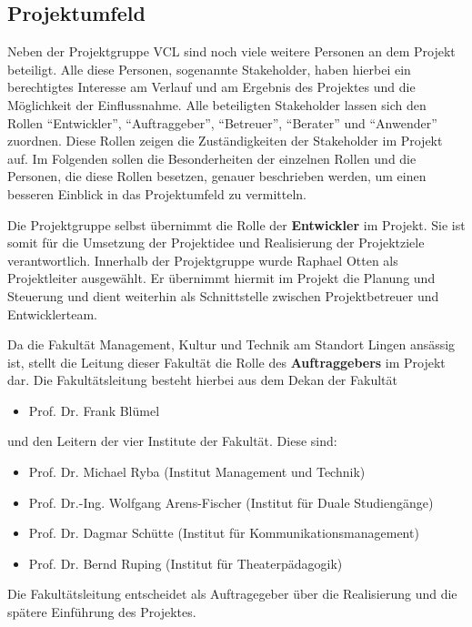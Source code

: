 \subsection{Projektumfeld}
\label{sec:Projektumfeld}

Neben der Projektgruppe \acs{VCL} sind noch viele weitere Personen an dem
Projekt beteiligt. Alle diese Personen, sogenannte Stakeholder, haben hierbei
ein berechtigtes Interesse am Verlauf und am Ergebnis des Projektes und die Möglichkeit
der Einflussnahme. Alle
beteiligten Stakeholder lassen sich den Rollen "`Entwickler"', "`Auftraggeber"',
"`Betreuer"', "`Berater"' und "`Anwender"' zuordnen. Diese Rollen zeigen die Zuständigkeiten
der Stakeholder im Projekt auf.
Im Folgenden sollen die
Besonderheiten der einzelnen Rollen und die Personen, die diese Rollen besetzen,
genauer beschrieben werden, um einen besseren Einblick in das Projektumfeld zu
vermitteln.

Die Projektgruppe selbst übernimmt die Rolle der \textbf{Entwickler} im Projekt. Sie ist
somit für die Umsetzung der Projektidee und Realisierung der Projektziele
verantwortlich. Innerhalb der Projektgruppe wurde Raphael Otten als
Projektleiter ausgewählt. Er übernimmt hiermit im Projekt die Planung und
Steuerung und dient weiterhin als Schnittstelle zwischen Projektbetreuer und
Entwicklerteam.

Da die Fakultät Management, Kultur und Technik am Standort Lingen ansässig ist,
stellt die Leitung dieser Fakultät die Rolle des \textbf{Auftraggebers} im Projekt dar.
Die Fakultätsleitung besteht hierbei aus dem Dekan der Fakultät
\begin{itemize}
  \item Prof. Dr. Frank Blümel
\end{itemize}
und den Leitern der vier Institute der Fakultät. Diese sind:

\clearpage

\begin{itemize}
  \item Prof. Dr. Michael Ryba (Institut Management und Technik)
  \item Prof. Dr.-Ing. Wolfgang Arens-Fischer (Institut für Duale Studiengänge)
  \item Prof. Dr. Dagmar Schütte (Institut für Kommunikationsmanagement)
  \item Prof. Dr. Bernd Ruping (Institut für Theaterpädagogik)
\end{itemize}

Die Fakultätsleitung entscheidet als Auftragegeber über die Realisierung und
die spätere Einführung des Projektes.

